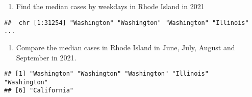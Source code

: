 \documentclass[
]{article}
\newenvironment{Shaded}{\begin{snugshade}}{\end{snugshade}}
\newcommand{\FunctionTok}[1]{\textcolor[rgb]{0.00,0.00,0.00}{#1}}
\newcommand{\NormalTok}[1]{#1}
\newcommand{\OtherTok}[1]{\textcolor[rgb]{0.56,0.35,0.01}{#1}}
\newcommand{\SpecialCharTok}[1]{\textcolor[rgb]{0.00,0.00,0.00}{#1}}
\newcommand{\StringTok}[1]{\textcolor[rgb]{0.31,0.60,0.02}{#1}}
\providecommand{\tightlist}{%
  \setlength{\itemsep}{0pt}\setlength{\parskip}{0pt}}
\begin{document}
\begin{Shaded}
\end{Shaded}

\begin{enumerate}
\def\labelenumi{\arabic{enumi}.}
\setcounter{enumi}{13}
\tightlist
\item
  Find the median cases by weekdays in Rhode Island in 2021
\end{enumerate}

\begin{Shaded}
\end{Shaded}

\begin{verbatim}
##  chr [1:31254] "Washington" "Washington" "Washington" "Illinois" ...
\end{verbatim}

\begin{enumerate}
\def\labelenumi{\arabic{enumi}.}
\setcounter{enumi}{14}
\tightlist
\item
  Compare the median cases in Rhode Island in June, July, August and
  September in 2021.
\end{enumerate}

\begin{Shaded}
\end{Shaded}

\begin{verbatim}
## [1] "Washington" "Washington" "Washington" "Illinois"   "Washington"
## [6] "California"
\end{verbatim}
\end{document}
